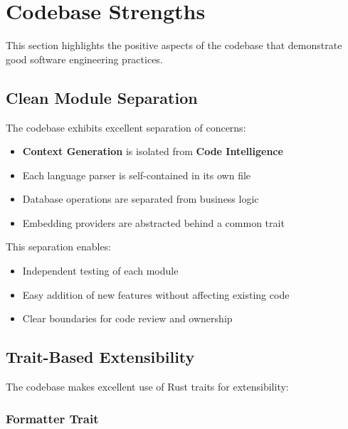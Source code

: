 
\section{Codebase Strengths}
\label{sec:strengths}

This section highlights the positive aspects of the \ctx{} codebase that demonstrate good software engineering practices.

\subsection{Clean Module Separation}

The codebase exhibits excellent separation of concerns:

\begin{itemize}
    \item \textbf{Context Generation} is isolated from \textbf{Code Intelligence}
    \item Each language parser is self-contained in its own file
    \item Database operations are separated from business logic
    \item Embedding providers are abstracted behind a common trait
\end{itemize}

This separation enables:
\begin{itemize}
    \item Independent testing of each module
    \item Easy addition of new features without affecting existing code
    \item Clear boundaries for code review and ownership
\end{itemize}

\subsection{Trait-Based Extensibility}

The codebase makes excellent use of Rust traits for extensibility:

\subsubsection{Formatter Trait}

